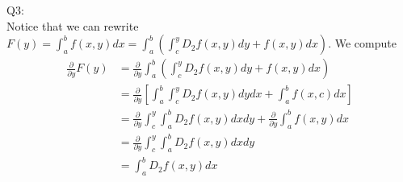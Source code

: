 \documentclass[letterpaper]{article}
\begin{document}
Q3:\\ 
Notice that we can rewrite $F(y)=\int_a^b f(x,y)dx = \int_a^b (\int_c^y D_2f(x,y)dy + f(x,y)dx)$. We compute 
\begin{align*}
     \frac{\partial }{\partial y} F(y) & = \frac{\partial}{\partial y} \int_a^b (\int_c^y D_2f(x,y)dy + f(x,y)dx)
     \\ & = \frac{\partial}{\partial y} \left[\int_a^b \int_c^y D_2f(x,y)dydx + \int_a^b f(x,c)dx \right] \tag{by linearity}
     \\ & = \frac{\partial}{\partial y} \int_c^y \int_a^b D_2f(x,y)dxdy + \frac{\partial}{\partial y}\int_a^b f(x,y)dx \tag{by Fubini's Theorem}
     \\ & = \frac{\partial}{\partial y} \int_c^y \int_a^b D_2f(x,y)dxdy
     \\ & = \int_a^b D_2f(x,y)dx \tag{by FTC}
\end{align*}
\end{document}
